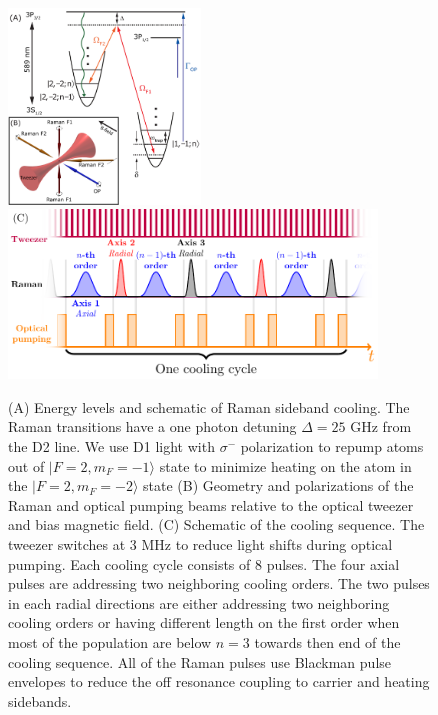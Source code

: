 \documentclass[aps,prl,twocolumn,groupedaddress]{revtex4-1}
\begin{document}
\begin{figure}
  \includegraphics[height=5.2cm]{imgs/Na_RSC_schematic.pdf}
  \includegraphics[height=4.5cm]{sequence.pdf}
  \caption{(A) Energy levels and schematic of Raman sideband cooling.
    The Raman transitions have a one photon detuning $\Delta=25$ GHz from the D2 line.
    We use D1 light with $\sigma^-$ polarization to repump atoms out of $|F=2,m_F=-1\rangle$
    state to minimize heating on the atom in the $|F=2,m_F=-2\rangle$ state
    (B) Geometry and polarizations of the Raman and optical pumping beams relative to the
    optical tweezer and bias magnetic field.
    (C) Schematic of the cooling sequence. The tweezer switches at 3 MHz to
    reduce light shifts during optical pumping. Each cooling cycle consists of $8$ pulses.
    The four axial pulses are addressing two neighboring cooling orders.
    The two pulses in each radial directions are either addressing two neighboring cooling orders
    or having different length on the first order when most of the population are below $n=3$
    towards then end of the cooling sequence.
    All of the Raman pulses use Blackman pulse envelopes to reduce the off resonance
    coupling to carrier and heating sidebands.
    \label{f-setup}}
\end{figure}
\end{document}
